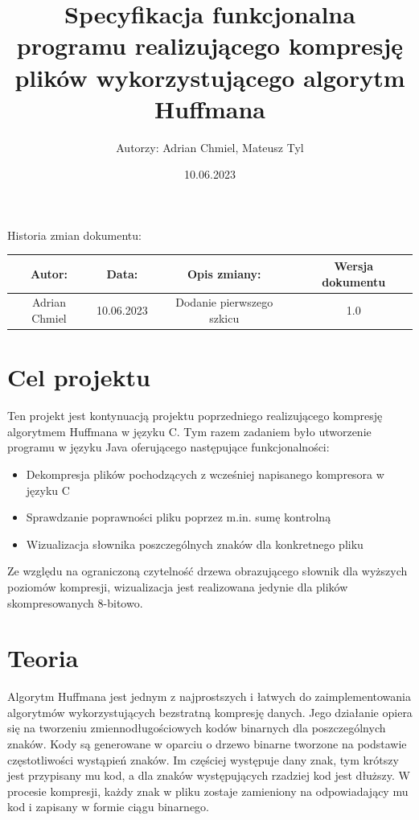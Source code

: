 \documentclass[]{article}
\title{Specyfikacja funkcjonalna programu realizującego kompresję plików wykorzystującego algorytm Huffmana}
\author{Autorzy: Adrian Chmiel, Mateusz Tyl}
\date{10.06.2023}
\begin{document}
\maketitle
\begin{center}
Historia zmian dokumentu:\\
\end{center}

\begin{tabular}{|c|c|c|c|}
  \hline 
  Autor: & Data: & Opis zmiany:& Wersja dokumentu \\
  \hline
  Adrian Chmiel & 10.06.2023 & Dodanie pierwszego szkicu & 1.0 \\
  \hline
\end{tabular} 
\section{Cel projektu}\label{header-n231}

Ten projekt jest kontynuacją projektu poprzedniego realizującego kompresję algorytmem Huffmana w języku C. Tym razem zadaniem było utworzenie programu w języku Java oferującego następujące funkcjonalności:
\begin{itemize}
\item
Dekompresja plików pochodzących z wcześniej napisanego kompresora w języku C
\item
Sprawdzanie poprawności pliku poprzez m.in. sumę kontrolną
\item
Wizualizacja słownika poszczególnych znaków dla konkretnego pliku\end{itemize}
Ze względu na ograniczoną czytelność drzewa obrazującego słownik dla wyższych poziomów kompresji, wizualizacja jest realizowana jedynie dla plików skompresowanych 8-bitowo.
\section{Teoria}\label{header-n281}
Algorytm Huffmana jest jednym z najprostszych i łatwych do zaimplementowania algorytmów wykorzystujących bezstratną kompresję danych. Jego działanie opiera się na tworzeniu zmiennodługościowych kodów binarnych dla poszczególnych znaków. Kody są generowane w oparciu o drzewo binarne tworzone na podstawie częstotliwości wystąpień znaków. Im częściej występuje dany znak, tym krótszy jest przypisany mu kod, a dla znaków występujących rzadziej kod jest dłuższy. W procesie kompresji, każdy znak w pliku zostaje zamieniony na odpowiadający mu kod i zapisany w formie ciągu binarnego.\\
\end{document}
